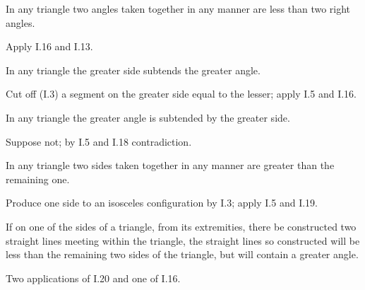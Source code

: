 \documentclass{rrxiv}
\begin{document}
\begin{claim}
\label{prop:I.17}
In any triangle two angles taken together in any manner are less than
two right angles.
\end{claim}
\begin{evidence}[Proof of I.17]
\label{ev:I.17}
Apply I.16 and I.13.
\end{evidence}

\begin{claim}
\label{prop:I.18}
In any triangle the greater side subtends the greater angle.
\end{claim}
\begin{evidence}[Proof of I.18]
\label{ev:I.18}
Cut off (I.3) a segment on the greater side equal to the lesser;
apply I.5 and I.16.
\end{evidence}

\begin{claim}
\label{prop:I.19}
In any triangle the greater angle is subtended by the greater side.
\end{claim}
\begin{evidence}[Proof of I.19]
\label{ev:I.19}
Suppose not; by I.5 and I.18 contradiction.
\end{evidence}

\begin{claim}
\label{prop:I.20}
In any triangle two sides taken together in any manner are greater
than the remaining one.
\end{claim}
\begin{evidence}[Proof of I.20]
\label{ev:I.20}
Produce one side to an isosceles configuration by I.3; apply I.5 and
I.19.
\end{evidence}

\begin{claim}
\label{prop:I.21}
If on one of the sides of a triangle, from its extremities, there be
constructed two straight lines meeting within the triangle, the
straight lines so constructed will be less than the remaining two
sides of the triangle, but will contain a greater angle.
\end{claim}
\begin{evidence}[Proof of I.21]
\label{ev:I.21}
Two applications of I.20 and one of I.16.
\end{evidence}
\end{document}
